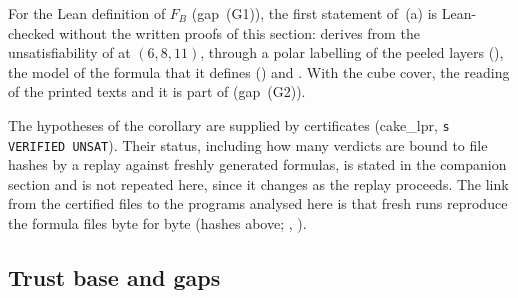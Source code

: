 For the Lean definition  of $F_B$ (gap~(G1)), the first statement of~(a) is Lean-checked without the
written proofs of this section:  derives  from the unsatisfiability
of  at $(6,8,11)$, through a polar labelling of the peeled layers
(), the model of the formula that it defines
() and . With the cube cover, the reading of the printed
texts and  it is part of  (gap~(G2)).

The hypotheses of the corollary are supplied by certificates (cake\_lpr, \texttt{s VERIFIED UNSAT}). Their status,
including how many verdicts are bound to file hashes by a replay against freshly generated formulas, is stated in the
companion section and is not repeated here, since it changes as the replay proceeds. The link
from the certified files to the programs analysed here is that fresh runs reproduce the formula files byte for byte
(hashes above; , ).

\subsection{Trust base and gaps}\label{k8s:sec:trust}

